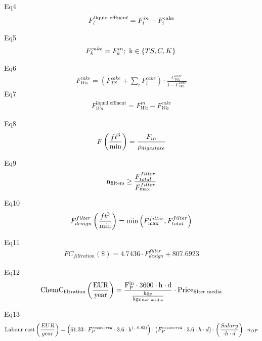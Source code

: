 \documentclass[10pt,a4paper]{article}
\begin{document}
Eq4
\begin{align}
	F_i^{{\text{liquid effluen}}t} = F_i^{in} - F_{\rm{i}}^{{\rm{cake}}}
\end{align}

Eq5
\begin{align}
	F_k^{cake} = F_k^{in}; {\text{   k}} \in \left\{ {TS,C,K} \right\}{\rm{  }}
\end{align}

Eq6
\begin{align}
	F_{Wa}^{cake} = \left( {F_{TS}^{cake} + \sum\limits_i {F_i^{cake}} } \right) \cdot \frac{{C_{Wa}^{cake}}}{{1 - C_{Wa}^{cake}}}
\end{align}
%
Eq7
\begin{align}
	F_{Wa}^{{\text{liquid effluent}}} = F_{Wa}^{in} - F_{Wa}^{cake}
\end{align}

Eq8
\begin{align}
	F\left( {\frac{{f{t^3}}}{{{\rm{min}}}}} \right) = \frac{{{F_{in}}}}{{{\rho _{digestate}}}}
\end{align}

Eq9
\begin{align}
	{{\rm{n}}_{{\rm{filters}}}} \ge \frac{{F_{total}^{filter}}}{{F_{{\rm{max}}}^{filter}}} 	
\end{align}

Eq10
\begin{align}
	F_{design}^{filter}\left( {\frac{{f{t^3}}}{{\min }}} \right) = \min \left( {F_{{\rm{max}}}^{filter},F_{total}^{filter}} \right)
\end{align}

Eq11
\begin{align}
	FC_{filtration}\left( \$  \right) = 4.7436\cdot F_{design}^{filter} + 807.6923 
\end{align}

Eq12
\begin{align}
	\rm{ChemC}_{filtration}\left(\frac{\text{EUR}}{\text{year}}\right) = 	\frac{F_{P}^{in} \cdot 3600 \cdot h \cdot d}{\frac{kg_P}{kg_{\text{filter media}}}} \cdot \rm{Price}_{\text{filter media}}
\end{align}

Eq13
\begin{align}
	{\text{Labour cost}}\left( {\frac{EUR }{{year}}} \right) = \left( {61.33\cdot F_P^{re{\mathop{\rm cov}} ered} \cdot 3.6\cdot{{\rm{h}}^{\left( { - 0.82} \right)}}} \right) \cdot \left( {F_P^{re{\mathop{\rm cov}} ered} \cdot 3.6 \cdot h \cdot d} \right) \cdot \left( {\frac{{Salary}}{{\cdot h \cdot d}}} \right)\cdot{n_{OP}}
\end{align}
\end{document}

